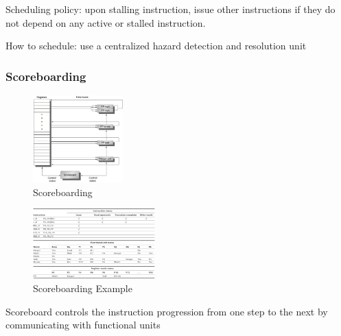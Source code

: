 Scheduling policy: upon stalling instruction, issue other instructions if they do not depend on any active or stalled instruction. 

How to schedule: use a centralized hazard detection and resolution unit

\subsubsection{Scoreboarding}
\begin{figure}[!htb]
    \centering
    \includegraphics[width=0.309\textwidth]{pic/CA3/Scoreboarding}
    \caption{Scoreboarding}
\end{figure}

\begin{figure}[!htb]
    \centering
    \includegraphics[width=0.42\textwidth]{pic/CA3/Scoreboarding Example}
    \caption{Scoreboarding Example}
\end{figure}

Scoreboard controls the instruction progression from one step to the next by communicating with functional units

